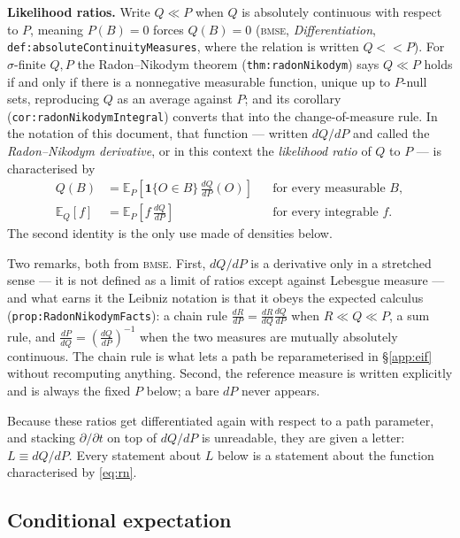 \documentclass[11pt,a4paper]{article}
\theoremstyle{plain}
\theoremstyle{definition}
\theoremstyle{remark}
\newcommand{\E}{\mathbb E}
\newcommand{\one}[1]{\mathbf 1\{#1\}}
\newcommand{\code}[1]{\texttt{\small #1}}
\newcommand{\probrepo}{\textsc{bmse}}
\begin{document}
\textbf{Likelihood ratios.} Write $Q\ll P$ when $Q$ is absolutely continuous with respect to $P$,
meaning $P(B)=0$ forces $Q(B)=0$ (\probrepo{}, \emph{Differentiation},
\code{def:absoluteContinuityMeasures}, where the relation is written $Q<<P$). For $\sigma$-finite
$Q,P$ the Radon--Nikodym theorem (\code{thm:radonNikodym}) says $Q\ll P$ holds if and only if
there is a nonnegative measurable function, unique up to $P$-null sets, reproducing $Q$ as an
average against $P$; and its corollary (\code{cor:radonNikodymIntegral}) converts that into the
change-of-measure rule. In the notation of this document, that function --- written $dQ/dP$ and
called the \emph{Radon--Nikodym derivative}, or in this context the \emph{likelihood ratio} of
$Q$ to $P$ --- is characterised by
\begin{equation}
\begin{aligned}
Q(B)&=\E_P\left[\one{O\in B}\,\frac{dQ}{dP}(O)\right]
&&\text{for every measurable }B,\\
\E_Q[f]&=\E_P\left[f\,\frac{dQ}{dP}\right]
&&\text{for every integrable }f.
\end{aligned}
\label{eq:rn}
\end{equation}
The second identity is the only use made of densities below.

Two remarks, both from \probrepo{}. First, $dQ/dP$ is a derivative only in a stretched sense ---
it is not defined as a limit of ratios except against Lebesgue measure --- and what earns it the
Leibniz notation is that it obeys the expected calculus (\code{prop:RadonNikodymFacts}): a chain
rule $\frac{dR}{dP}=\frac{dR}{dQ}\frac{dQ}{dP}$ when $R\ll Q\ll P$, a sum rule, and
$\frac{dP}{dQ}=(\frac{dQ}{dP})^{-1}$ when the two measures are mutually absolutely continuous.
The chain rule is what lets a path be reparameterised in \S\ref{app:eif} without recomputing
anything. Second, the reference measure is written explicitly and is always the fixed $P$ below;
a bare $dP$ never appears.

Because these ratios get differentiated again with respect to a path parameter, and stacking
$\partial/\partial t$ on top of $dQ/dP$ is unreadable, they are given a letter: $L\equiv dQ/dP$.
Every statement about $L$ below is a statement about the function characterised by
\eqref{eq:rn}.

\subsection{Conditional expectation}\label{app:condexp}
\end{document}
